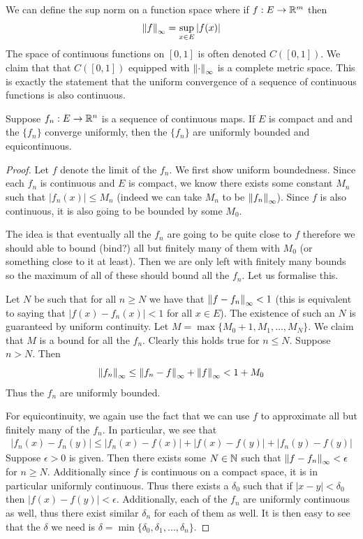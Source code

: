 We can define the sup norm on a function space where if $f: E \to \mathbb{R}^m$ then
$$ \left\lVert f\right\rVert_\infty = \sup_{x \in E} |f(x)| $$
The space of continuous functions on $[0, 1]$ is often denoted $C([0, 1])$. We claim that that $C([0, 1])$ equipped with $\left\lVert\cdot\right\rVert_{\infty}$ is a complete metric space. This is exactly the statement that the uniform convergence of a sequence of continuous functions is also continuous.

\begin{theorem}
    Suppose $f_n: E \to \mathbb{R}^n$  is a sequence of continuous maps. If $E$ is compact and and the $\{f_n\}$ converge uniformly, then the $\{f_n\}$ are uniformly bounded and equicontinuous.
\end{theorem}
\begin{proof}
Let $f$ denote the limit of the $f_n$. We first show uniform boundedness. Since each $f_n$ is continuous and $E$ is compact, we know there exists some constant $M_n$ such that $|f_n(x)| \leq M_n$ (indeed we can take $M_n$ to be $\left\lVert f_n\right\rVert_{\infty}$). Since $f$ is also continuous, it is also going to be bounded by some $M_0$.

The idea is that eventually all the $f_n$ are going to be quite close to $f$ therefore we should able to bound (bind?) all but finitely many of them with $M_0$ (or something close to it at least). Then we are only left with finitely many bounds so the maximum of all of these should bound all the $f_n$. Let us formalise this.

Let $N$ be such that for all $n \geq N$ we have that $\left\lVert f - f_n\right\rVert_{\infty} < 1$ (this is equivalent to saying that $|f(x) - f_n(x)| < 1$ for all $x \in E$). The existence of such an $N$ is guaranteed by uniform continuity. Let $M = \max\{M_0 + 1, M_1, \dots, M_{N}\}$. We claim that $M$ is a bound for all the $f_n$. Clearly this holds true for $n \leq N$. Suppose $n > N$. Then
$$ \left\lVert f_n\right\rVert_{\infty} \leq \left\lVert f_n - f\right\rVert_{\infty} + \left\lVert f\right\rVert_{\infty} < 1 + M_0 $$
Thus the $f_n$ are uniformly bounded.

For equicontinuity, we again use the fact that we can use $f$ to approximate all but finitely many of the $f_n$. In particular, we see that
\begin{align*}
    |f_n(x) - f_n(y)| \leq |f_n(x) - f(x)| + |f(x) - f(y)| + |f_n(y) - f(y)|
\end{align*}
Suppose $\epsilon > 0$ is given. Then there exists some $N \in \mathbb{N}$ such that $\left\lVert f - f_n\right\rVert_{\infty} < \epsilon$ for $n \geq N$. Additionally since $f$ is continuous on a compact space, it is in particular uniformly continuous. Thus there exists a $\delta_0$ such that if $|x - y| < \delta_0$ then $|f(x) - f(y)| < \epsilon$. Additionally, each of the $f_n$ are uniformly continuous as well, thus there exist similar $\delta_n$ for each of them as well. It is then easy to see that the $\delta$ we need is $\delta = \min\{\delta_0, \delta_1, \dots, \delta_n\}$.
\end{proof}

